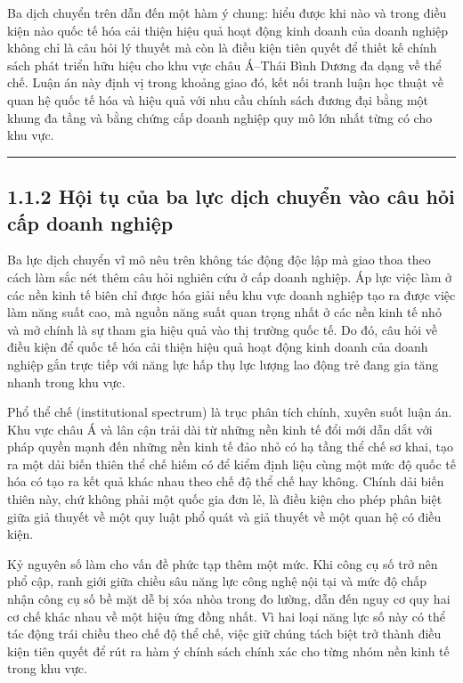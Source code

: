 \documentclass[
  a4paper,
  13pt]{extreport}
\begin{document}
Ba dịch chuyển trên dẫn đến một hàm ý chung: hiểu được khi nào và trong
điều kiện nào quốc tế hóa cải thiện hiệu quả hoạt động kinh doanh của
doanh nghiệp không chỉ là câu hỏi lý thuyết mà còn là điều kiện tiên
quyết để thiết kế chính sách phát triển hữu hiệu cho khu vực châu
Á--Thái Bình Dương đa dạng về thể chế. Luận án này định vị trong khoảng
giao đó, kết nối tranh luận học thuật về quan hệ quốc tế hóa và hiệu quả
với nhu cầu chính sách đương đại bằng một khung đa tầng và bằng chứng
cấp doanh nghiệp quy mô lớn nhất từng có cho khu vực.

\begin{center}\rule{0.5\linewidth}{0.5pt}\end{center}

\hypertarget{hux1ed9i-tux1ee5-cux1ee7a-ba-lux1ef1c-dux1ecbch-chuyux1ec3n-vuxe0o-cuxe2u-hux1ecfi-cux1ea5p-doanh-nghiux1ec7p}{%
\subsection{1.1.2 Hội tụ của ba lực dịch chuyển vào câu hỏi cấp doanh
nghiệp}\label{hux1ed9i-tux1ee5-cux1ee7a-ba-lux1ef1c-dux1ecbch-chuyux1ec3n-vuxe0o-cuxe2u-hux1ecfi-cux1ea5p-doanh-nghiux1ec7p}}

Ba lực dịch chuyển vĩ mô nêu trên không tác động độc lập mà giao thoa
theo cách làm sắc nét thêm câu hỏi nghiên cứu ở cấp doanh nghiệp. Áp lực
việc làm ở các nền kinh tế biên chỉ được hóa giải nếu khu vực doanh
nghiệp tạo ra được việc làm năng suất cao, mà nguồn năng suất quan trọng
nhất ở các nền kinh tế nhỏ và mở chính là sự tham gia hiệu quả vào thị
trường quốc tế. Do đó, câu hỏi về điều kiện để quốc tế hóa cải thiện
hiệu quả hoạt động kinh doanh của doanh nghiệp gắn trực tiếp với năng
lực hấp thụ lực lượng lao động trẻ đang gia tăng nhanh trong khu vực.

Phổ thể chế (institutional spectrum) là trục phân tích chính, xuyên suốt
luận án. Khu vực châu Á và lân cận trải dài từ những nền kinh tế đổi mới
dẫn dắt với pháp quyền mạnh đến những nền kinh tế đảo nhỏ có hạ tầng thể
chế sơ khai, tạo ra một dải biến thiên thể chế hiếm có để kiểm định liệu
cùng một mức độ quốc tế hóa có tạo ra kết quả khác nhau theo chế độ thể
chế hay không. Chính dải biến thiên này, chứ không phải một quốc gia đơn
lẻ, là điều kiện cho phép phân biệt giữa giả thuyết về một quy luật phổ
quát và giả thuyết về một quan hệ có điều kiện.

Kỷ nguyên số làm cho vấn đề phức tạp thêm một mức. Khi công cụ số trở
nên phổ cập, ranh giới giữa chiều sâu năng lực công nghệ nội tại và mức
độ chấp nhận công cụ số bề mặt dễ bị xóa nhòa trong đo lường, dẫn đến
nguy cơ quy hai cơ chế khác nhau về một hiệu ứng đồng nhất. Vì hai loại
năng lực số này có thể tác động trái chiều theo chế độ thể chế, việc giữ
chúng tách biệt trở thành điều kiện tiên quyết để rút ra hàm ý chính
sách chính xác cho từng nhóm nền kinh tế trong khu vực.
\end{document}
